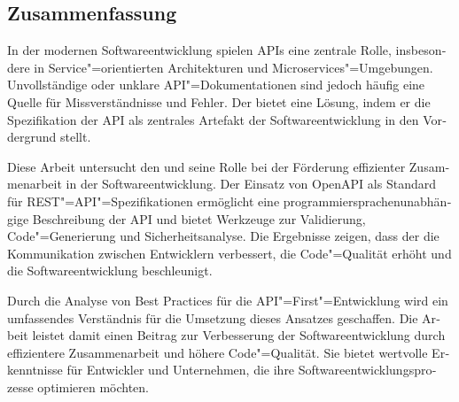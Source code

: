 \begin{otherlanguage}{ngerman}
	\chapter*{Zusammenfassung}
	In der modernen Softwareentwicklung spielen APIs eine zentrale Rolle, insbesondere in Service"=orientierten Architekturen und Microservices"=Umgebungen.
	Unvollständige oder unklare API"=Dokumentationen sind jedoch häufig eine Quelle für Missverständnisse und Fehler.
	Der \AFA bietet eine Lösung, indem er die Spezifikation der API als zentrales Artefakt der Softwareentwicklung in den Vordergrund stellt.

	Diese Arbeit untersucht den \AFA und seine Rolle bei der Förderung effizienter Zusammenarbeit in der Softwareentwicklung.
	Der Einsatz von OpenAPI als Standard für REST"=API"=Spezifikationen ermöglicht eine programmiersprachenunabhängige Beschreibung der API und bietet Werkzeuge zur Validierung, Code"=Generierung und Sicherheitsanalyse.
	Die Ergebnisse zeigen, dass der \AFA die Kommunikation zwischen Entwicklern verbessert, die Code"=Qualität erhöht und die Softwareentwicklung beschleunigt.

	Durch die Analyse von Best Practices für die API"=First"=Entwicklung wird ein umfassendes Verständnis für die Umsetzung dieses Ansatzes geschaffen.
	Die Arbeit leistet damit einen Beitrag zur Verbesserung der Softwareentwicklung durch effizientere Zusammenarbeit und höhere Code"=Qualität.
	Sie bietet wertvolle Erkenntnisse für Entwickler und Unternehmen, die ihre Softwareentwicklungsprozesse optimieren möchten.
\end{otherlanguage}
